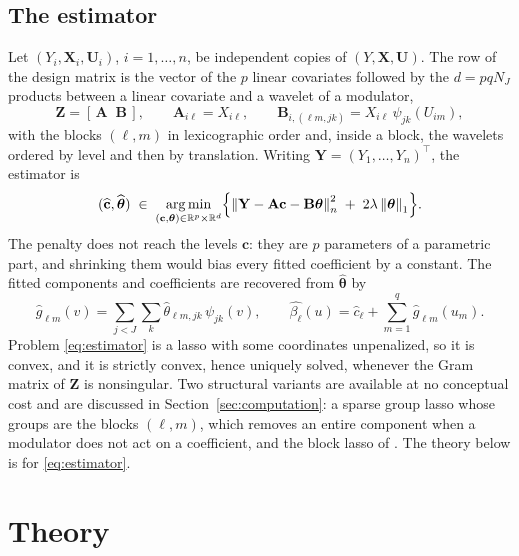 \documentclass[12pt]{article} %
\theoremstyle{definition}
\newcommand{\R}{\mathbb{R}}
\newcommand{\T}{^{\top}}
\newcommand{\norm}[1]{\left\lVert #1 \right\rVert}
\newcommand{\normn}[1]{\left\lVert #1 \right\rVert_{n}}
\newcommand{\cv}{\ell}
\newcommand{\md}{m}
\newcommand{\lev}{j}
\newcommand{\tsl}{k}
\newcommand{\NJ}{N_{J}}
\newcommand{\bX}{\mathbf{X}}
\newcommand{\bU}{\mathbf{U}}
\newcommand{\bZ}{\mathbf{Z}}
\newcommand{\fcoef}[1]{\beta_{#1}}
\newcommand{\wav}[2]{\psi_{#1#2}}
\newcommand{\btheta}{\boldsymbol{\theta}}
\newcommand{\thetahat}{\widehat{\btheta}}
\newcommand{\bc}{\mathbf{c}}
\newcommand{\chat}{\widehat{\mathbf{c}}}
\newcommand{\pen}{\lambda}
\newcommand{\Amat}{\mathbf{A}}
\newcommand{\Bmat}{\mathbf{B}}
\newcommand{\bY}{\mathbf{Y}}
\begin{document}
\subsection{The estimator}
\label{sec:estimator}

Let $(Y_i,\bX_i,\bU_i)$, $i = 1,\dots,n$, be independent copies of
$(Y,\bX,\bU)$. The row of the design matrix is the vector of the $p$ linear
covariates followed by the $d = pq\NJ$ products between a linear covariate and
a wavelet of a modulator,
\begin{equation}
  \label{eq:design}
  \bZ = [\,\Amat \;\; \Bmat\,], \qquad
  \Amat_{i\cv} = X_{i\cv}, \qquad
  \Bmat_{i,(\cv\md,\lev\tsl)} = X_{i\cv}\,\wav{\lev}{\tsl}(U_{i\md}),
\end{equation}
with the blocks $(\cv,\md)$ in lexicographic order and, inside a block, the
wavelets ordered by level and then by translation. Writing
$\bY = (Y_1,\dots,Y_n)\T$, the estimator is
\begin{equation}
  \label{eq:estimator}
  (\chat,\thetahat) \;\in\; \mathop{\rm arg\,min}_{(\bc,\btheta)\in
  \R^{p}\times\R^{d}}
  \Bigl\{\normn{\bY - \Amat\bc - \Bmat\btheta}^{2}
  \;+\; 2\pen\norm{\btheta}_{1}\Bigr\} .
\end{equation}
The penalty does not reach the levels $\bc$: they are $p$ parameters of a
parametric part, and shrinking them would bias every fitted coefficient by a
constant. The fitted components and coefficients are recovered from
$\thetahat$ by
\[
  \widehat{g}_{\cv\md}(v) = \sum_{\lev<J}\sum_{\tsl}
  \widehat{\theta}_{\cv\md,\lev\tsl}\,\wav{\lev}{\tsl}(v),
  \qquad
  \widehat{\fcoef{\cv}}(u) = \widehat{c}_{\cv}
  + \sum_{\md=1}^{q}\widehat{g}_{\cv\md}(u_{\md}).
\]
Problem \eqref{eq:estimator} is a lasso \textcolor{colR1}{\citep{tibshirani1996regression}} with some coordinates unpenalized, so
it is convex, and it is strictly convex, hence uniquely solved, whenever the
Gram matrix of $\bZ$ is nonsingular. Two structural variants are available at
no conceptual cost and are discussed in Section~\ref{sec:computation}: a
sparse group lasso \citep{Simon-Friedman-Hastie-Tibshirani-2013} whose groups
are the blocks $(\cv,\md)$, which removes an entire component when a modulator
does not act on a coefficient, and the block lasso of
\citet{Klopp-Pensky-2015}. The theory below is for \eqref{eq:estimator}.

\section{Theory}
\label{sec:theory}
\end{document}
